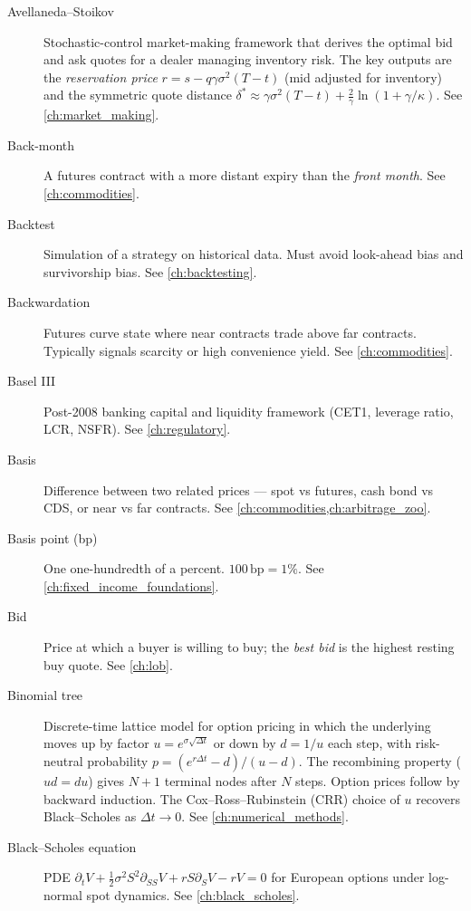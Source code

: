 \begin{description}
\item[Avellaneda--Stoikov]
Stochastic-control market-making framework that derives the optimal
bid and ask quotes for a dealer managing inventory risk. The key
outputs are the \emph{reservation price} $r = s - q\gamma\sigma^2(T-t)$
(mid adjusted for inventory) and the symmetric quote distance
$\delta^* \approx \gamma\sigma^2(T-t) + \tfrac{2}{\gamma}\ln(1+\gamma/\kappa)$.
See \cref{ch:market_making}.

\item[Back-month]
A futures contract with a more distant expiry than the \emph{front
month}. See \cref{ch:commodities}.

\item[Backtest]
Simulation of a strategy on historical data. Must avoid look-ahead bias
and survivorship bias. See \cref{ch:backtesting}.

\item[Backwardation]
Futures curve state where near contracts trade above far contracts.
Typically signals scarcity or high convenience yield. See \cref{ch:commodities}.

\item[Basel III]
Post-2008 banking capital and liquidity framework (CET1, leverage
ratio, LCR, NSFR). See \cref{ch:regulatory}.

\item[Basis]
Difference between two related prices --- spot vs futures, cash bond vs
CDS, or near vs far contracts. See \cref{ch:commodities,ch:arbitrage_zoo}.

\item[Basis point (bp)]
One one-hundredth of a percent. $100\,\text{bp} = 1\%$. See \cref{ch:fixed_income_foundations}.

\item[Bid]
Price at which a buyer is willing to buy; the \emph{best bid} is the
highest resting buy quote. See \cref{ch:lob}.

\item[Binomial tree]
Discrete-time lattice model for option pricing in which the underlying
moves up by factor $u = e^{\sigma\sqrt{\Delta t}}$ or down by $d = 1/u$
each step, with risk-neutral probability $p = (e^{r\Delta t}-d)/(u-d)$.
The recombining property ($ud=du$) gives $N+1$ terminal nodes after $N$
steps. Option prices follow by backward induction. The Cox--Ross--Rubinstein
(CRR) choice of $u$ recovers Black--Scholes as $\Delta t\to 0$.
See \cref{ch:numerical_methods}.

\item[Black--Scholes equation]
PDE $\partial_t V + \tfrac12\sigma^2 S^2 \partial_{SS}V + rS\partial_S V - rV = 0$
for European options under log-normal spot dynamics. See \cref{ch:black_scholes}.


\end{description}

